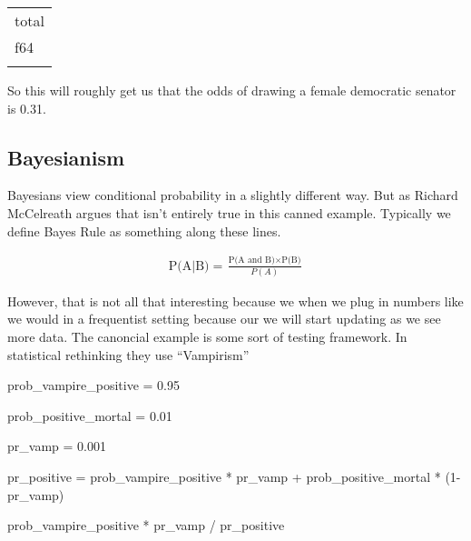 \documentclass[
  letterpaper,
  DIV=11,
  numbers=noendperiod]{scrreprt}
\newenvironment{Shaded}{\begin{snugshade}}{\end{snugshade}}
\newcommand{\DecValTok}[1]{\textcolor[rgb]{0.68,0.00,0.00}{#1}}
\newcommand{\FloatTok}[1]{\textcolor[rgb]{0.68,0.00,0.00}{#1}}
\newcommand{\NormalTok}[1]{\textcolor[rgb]{0.00,0.23,0.31}{#1}}
\newcommand{\OperatorTok}[1]{\textcolor[rgb]{0.37,0.37,0.37}{#1}}
\begin{document}
\begin{longtable}[]{@{}l@{}}
\toprule\noalign{}
total \\
f64 \\
\midrule\noalign{}
\endhead
\bottomrule\noalign{}
\endlastfoot
0.3125 \\
\end{longtable}

So this will roughly get us that the odds of drawing a female democratic
senator is 0.31.

\subsection{Bayesianism}\label{bayesianism}

Bayesians view conditional probability in a slightly different way. But
as Richard McCelreath argues that isn't entirely true in this canned
example. Typically we define Bayes Rule as something along these lines.

\begin{align}

\text{P(A|B)} = \frac{\text{P(A and B)} \times \text{P(B)}}{P(A)}

\end{align}

However, that is not all that interesting because we when we plug in
numbers like we would in a frequentist setting because our we will start
updating as we see more data. The canoncial example is some sort of
testing framework. In statistical rethinking they use ``Vampirism''

\begin{Shaded}
\begin{Highlighting}[]
\NormalTok{prob\_vampire\_positive }\OperatorTok{=} \FloatTok{0.95} 

\NormalTok{prob\_positive\_mortal }\OperatorTok{=} \FloatTok{0.01}

\NormalTok{pr\_vamp }\OperatorTok{=} \FloatTok{0.001} 

\NormalTok{pr\_positive }\OperatorTok{=}\NormalTok{ prob\_vampire\_positive }\OperatorTok{*}\NormalTok{ pr\_vamp }\OperatorTok{+}\NormalTok{ prob\_positive\_mortal }\OperatorTok{*}\NormalTok{ (}\DecValTok{1}\OperatorTok{{-}}\NormalTok{pr\_vamp)}

\NormalTok{prob\_vampire\_positive }\OperatorTok{*}\NormalTok{ pr\_vamp }\OperatorTok{/}\NormalTok{  pr\_positive}
\end{Highlighting}
\end{Shaded}
\end{document}
